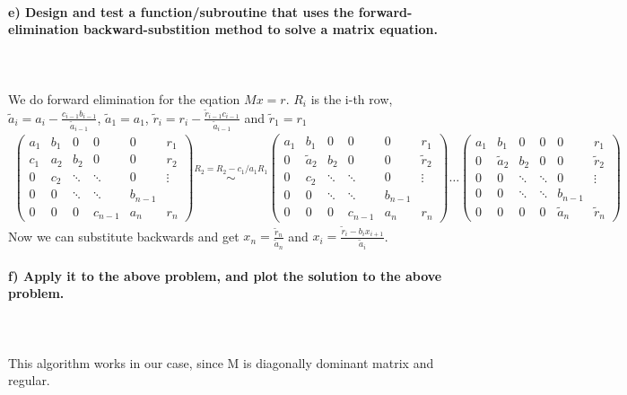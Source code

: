 \paragraph{
    e) Design and test a function/subroutine that uses the
    forward-elimination backward-substition method to solve a matrix
    equation.
} \ \\
    \\
    We do forward elimination for the eqation $Mx = r$. $R_i$ is the i-th row, $\tilde{a}_i = a_i - \frac{c_{i-1} b_{i-1}}{\tilde{a}_{i-1}}$, $\tilde{a}_1 = a_1$, $\tilde{r}_i = r_i - \frac{\tilde{r}_{i-1} c_{i-1}}{\tilde{a}_{i-1}}$ and $\tilde{r}_1 = r_1$
    \begin{align}
	\begin{pmatrix}
	a_1 & b_1 & 0      & 0       & 0   & r_1\\
	c_1 & a_2 & b_2    & 0       & 0 & r_2\\
	0   & c_2 & \ddots & \ddots  & 0 & \vdots\\
	0   & 0   & \ddots & \ddots  & b_{n-1} &\\
	0   & 0   & 0      & c_{n-1} & a_n& r_n
	\end{pmatrix}
	\overset{R_2 = R_2 - c_1/a_1 R_1}{\sim}
	\begin{pmatrix}
	a_1 & b_1 & 0      & 0       & 0   & r_1\\
	0 & \tilde{a}_2 & b_2    & 0       & 0 & \tilde{r}_2\\
	0   & c_2 & \ddots & \ddots  & 0 & \vdots\\
	0   & 0   & \ddots & \ddots  & b_{n-1} &\\
	0   & 0   & 0      & c_{n-1} & a_n& r_n
	\end{pmatrix}
	\dots
	\begin{pmatrix}
	a_1 & b_1 & 0      & 0       & 0   & r_1\\
	0 & \tilde{a}_2 & b_2    & 0       & 0 & \tilde{r}_2\\
	0   & 0 & \ddots & \ddots  & 0 & \vdots\\
	0   & 0   & \ddots & \ddots  & b_{n-1} &\\
	0   & 0   & 0      & 0 & \tilde{a}_n& \tilde{r}_n
	\end{pmatrix}
    \end{align}
    Now we can substitute backwards and get $x_n = \frac{\tilde{r}_n}{\tilde{a}_n} $ and $x_i = \frac{\tilde{r}_{i} - b_{i} x_{i+1}}{\tilde{a}_{i}}$.


\paragraph{
    f) Apply it to the above problem, and plot the solution to the
    above problem.
} \ \\
    \\
	This algorithm works in our case, since M is diagonally dominant matrix and regular.

